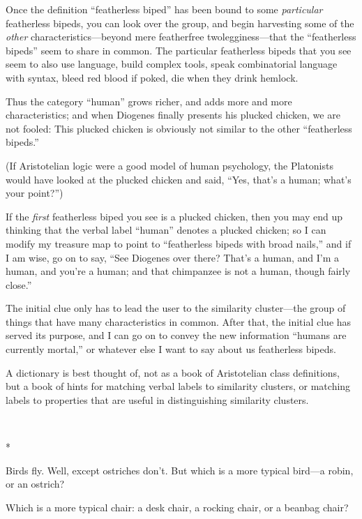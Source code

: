 {
 Once the definition ``featherless
biped'' has been bound to some \textit{particular}
featherless bipeds, you can look over the group, and begin harvesting
some of the \textit{other} characteristics---beyond mere featherfree
twolegginess---that the ``featherless
bipeds'' seem to share in common. The particular
featherless bipeds that you see seem to also use language, build
complex tools, speak combinatorial language with syntax, bleed red
blood if poked, die when they drink hemlock.}

{
 Thus the category ``human''
grows richer, and adds more and more characteristics; and when Diogenes
finally presents his plucked chicken, we are not fooled: This plucked
chicken is obviously not similar to the other
``featherless bipeds.''}

{
 (If Aristotelian logic were a good model of human psychology, the
Platonists would have looked at the plucked chicken and said,
``Yes, that's a human;
what's your point?'')}

{
 If the \textit{first} featherless biped you see is a plucked
chicken, then you may end up thinking that the verbal label
``human'' denotes a plucked chicken;
so I can modify my treasure map to point to
``featherless bipeds with broad
nails,'' and if I am wise, go on to say,
``See Diogenes over there? That's a
human, and I'm a human, and you're a
human; and that chimpanzee is not a human, though fairly
close.''}

{
 The initial clue only has to lead the user to the similarity
cluster---the group of things that have many characteristics in common.
After that, the initial clue has served its purpose, and I can go on to
convey the new information ``humans are currently
mortal,'' or whatever else I want to say about us
featherless bipeds.}

{
 A dictionary is best thought of, not as a book of Aristotelian
class definitions, but a book of hints for matching verbal labels to
similarity clusters, or matching labels to properties that are useful
in distinguishing similarity clusters.}

{\centering
 \ ~
\par}

{\centering
 *
\par}


{
 Birds fly. Well, except ostriches don't. But which
is a more typical bird---a robin, or an ostrich? }

{
 Which is a more typical chair: a desk chair, a rocking chair, or a
beanbag chair?}

